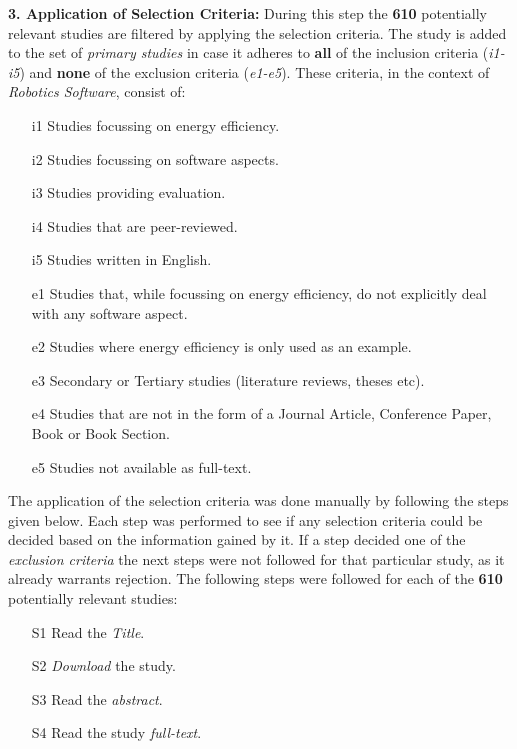\noindent\textbf{3. Application of Selection Criteria:}
During this step the \textbf{610} potentially relevant studies are filtered by applying the selection criteria. 
The study is added to the set of \textit{primary studies} in case it adheres to \textbf{all} of the inclusion criteria (\textit{i1-i5}) and \textbf{none} of the exclusion criteria (\textit{e1-e5}). 
These criteria, in the context of \textit{Robotics Software}, consist of:
\begin{itemize}
	\item[i1] Studies focussing on energy efficiency.
    \item[i2] Studies focussing on software aspects.
    \item[i3] Studies providing evaluation.
    \item[i4] Studies that are peer-reviewed.
    \item[i5] Studies written in English.
    
	\item[e1] Studies that, while focussing on energy efficiency, do not explicitly deal with any software aspect.
    \item[e2] Studies where energy efficiency is only used as an example.
    \item[e3] Secondary or Tertiary studies (literature reviews, theses etc).
    \item[e4] Studies that are not in the form of a Journal Article, Conference Paper, Book or Book Section.
    \item[e5] Studies not available as full-text.
\end{itemize}

The application of the selection criteria was done manually by following the steps given below. 
Each step was performed to see if any selection criteria could be decided based on the information gained by it. 
If a step decided one of the \textit{exclusion criteria} the next steps were not followed for that particular study, 
as it already warrants rejection. 
The following steps were followed for each of the \textbf{610} potentially relevant studies:
\begin{itemize}
	\item[S1] Read the \textit{Title}.
	\item[S2] \textit{Download} the study.
	\item[S3] Read the \textit{abstract}.
	\item[S4] Read the study \textit{full-text}.
\end{itemize}

